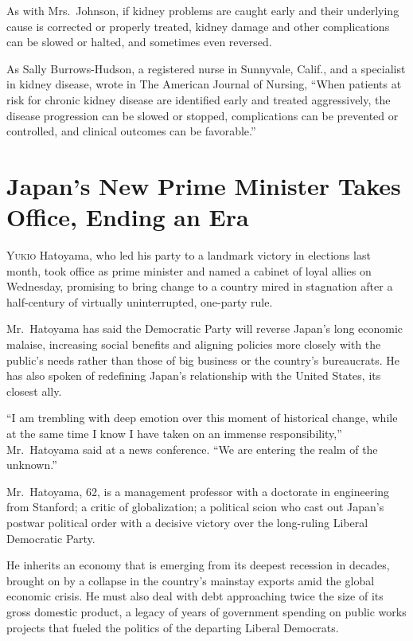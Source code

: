 ﻿\documentclass[12pt]{article}
\begin{document}
As with Mrs.~Johnson, if kidney problems are caught early and their underlying cause is corrected or
properly treated, kidney damage and other complications can be slowed or halted, and sometimes even
reversed.

As Sally Burrows-Hudson, a registered nurse in Sunnyvale, Calif., and a specialist in kidney
disease, wrote in The American Journal of Nursing, ``When patients at risk for chronic kidney
disease are identified early and treated aggressively, the disease progression can be slowed or
stopped, complications can be prevented or controlled, and clinical outcomes can be favorable.''

\section{Japan's New Prime Minister Takes Office, Ending an Era}

\lettrine{Y}{ukio} Hatoyama, who led his party to a landmark victory in elections last month, took
office as prime minister and named a cabinet of loyal allies on Wednesday, promising to bring change
to a country mired in stagnation after a half-century of virtually uninterrupted, one-party rule.

Mr.~Hatoyama has said the Democratic Party will reverse Japan's long economic malaise, increasing
social benefits and aligning policies more closely with the public's needs rather than those of big
business or the country's bureaucrats. He has also spoken of redefining Japan's relationship with
the United States, its closest ally.

``I am trembling\cite{tremble} with deep emotion over this moment of historical change, while at the
same time I know I have taken on an immense responsibility,'' Mr.~Hatoyama said at a news
conference. ``We are entering the realm of the unknown.''

Mr.~Hatoyama, 62, is a management professor with a doctorate in engineering from Stanford; a critic
of globalization; a political scion who cast out Japan's postwar political order with a decisive
victory over the long-ruling Liberal Democratic Party.

He inherits an economy that is emerging from its deepest recession in decades, brought on by a
collapse in the country's mainstay exports amid the global economic crisis. He must also deal with
debt approaching twice the size of its gross domestic product, a legacy of years of government
spending on public works projects that fueled the politics of the departing Liberal Democrats.
\end{document}

